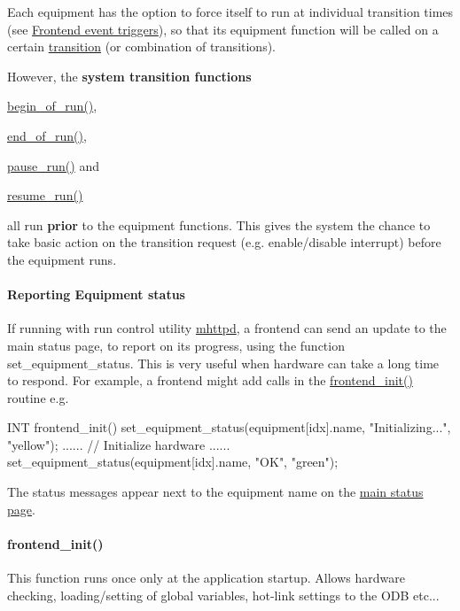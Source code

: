 Each equipment has the option to force itself to run at individual transition times (see \hyperlink{FrontendOperation_FE_event_trigger}{Frontend event triggers}), so that its equipment function will be called on a certain \hyperlink{RC_Run_States_and_Transitions}{transition} (or combination of transitions).

However, the {\bfseries system transition functions}
\begin{DoxyItemize}
\item \hyperlink{mfe_8c_ad8bfe703c49342b9f0275aba77dc7758}{begin\_\-of\_\-run()},
\item \hyperlink{mfe_8c_ae6d798649008b7523c77222bae2d4187}{end\_\-of\_\-run()},
\item \hyperlink{mfe_8c_a164db20cf6c8c81e8c8ca50a590de436}{pause\_\-run()} and
\item \hyperlink{mfe_8c_a6cada7e3f07b9fc2b9886263223661d4}{resume\_\-run()} \par
all run {\bfseries prior} to the equipment functions. This gives the system the chance to take basic action on the transition request (e.g. enable/disable interrupt) before the equipment runs.
\end{DoxyItemize}\hypertarget{FE_sequence_FE_frontend_status}{}\paragraph{Reporting Equipment status}\label{FE_sequence_FE_frontend_status}
If running with run control utility \hyperlink{RC_mhttpd_utility}{mhttpd}, a frontend can send an update to the main status page, to report on its progress, using the function set\_\-equipment\_\-status. This is very useful when hardware can take a long time to respond. For example, a frontend might add calls in the \hyperlink{FE_sequence_FE_frontend_init}{frontend\_\-init()} routine e.g. 
\begin{DoxyCode}
INT frontend_init()
{
   set_equipment_status(equipment[idx].name, "Initializing...", "yellow");
   ......  // Initialize hardware 
   ......
   set_equipment_status(equipment[idx].name, "OK", "green");
}
\end{DoxyCode}


The status messages appear next to the equipment name on the \hyperlink{RC_mhttpd_status_page_features_idx_mhttpd_page_status_equipment}{main status page}.

\par
 \par
 \hypertarget{FE_sequence_FE_frontend_init}{}\paragraph{frontend\_\-init()}\label{FE_sequence_FE_frontend_init}
This function runs once only at the application startup. Allows hardware checking, loading/setting of global variables, hot-\/link settings to the ODB etc...

